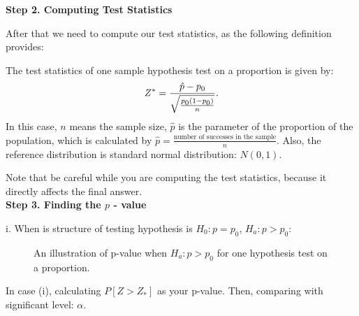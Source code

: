 \textbf{Step 2. Computing Test Statistics}

After that we need to compute our test statistics, as the following definition provides:

\begin{definition}
The test statistics of one sample hypothesis test on a proportion is given by: \[ Z^* = \frac{\hat{p} - p_{\text{\scriptsize$0$}}}{\sqrt{\frac{p_{\text{\scriptsize$0$}}(1-p_{\text{\scriptsize$0$}})}{n}}}.\]
In this case, $n$ means the sample size, $\hat{p}$ is the parameter of the proportion of the population, which is calculated by $\hat{p} = \frac{\text{number of successes in the sample}}{n}$. Also, the reference distribution is standard normal distribution: $N(0,1)$.
\end{definition}

Note that be careful while you are computing the test statistics, because it directly affects the final answer.\\

\textbf{Step 3. Finding the $p$ - value}

i. When is structure of testing hypothesis is $H_0: p = p_0$, $H_a: p > p_0$:

\begin{figure}[h]
\begin{center}
\end{center}
\caption{An illustration of p-value when $H_a: p > p_0$ for one hypothesis test on a proportion.}
\end{figure}

In case (i), calculating $P[Z > Z_*]$ as your p-value. Then, comparing with significant level: $\alpha$.

